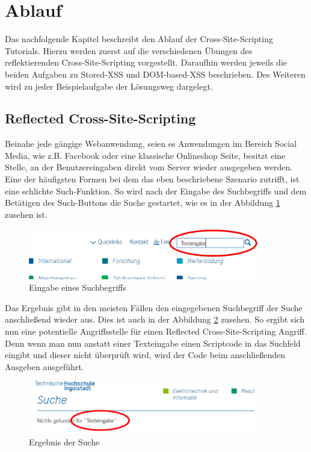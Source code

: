 \section{Ablauf}
Das nachfolgende Kapitel beschreibt den Ablauf der Cross-Site-Scripting Tutorials. Hierzu werden zuerst auf die verschiedenen Übungen des reflektierenden Cross-Site-Scripting vorgestellt. Daraufhin werden jeweils die beiden Aufgaben zu Stored-XSS und DOM-based-XSS beschrieben. Des Weiteren wird zu jeder Beispielaufgabe der Lösungsweg dargelegt. 

\subsection{Reflected Cross-Site-Scripting}
Beinahe jede gängige Webanwendung, seien es Anwendungen im Bereich Social Media, wie z.B. Facebook oder eine klassische Onlineshop Seite, besitzt eine Stelle, an der Benutzereingaben direkt vom Server wieder ausgegeben werden. \\
Eine der häufigsten Formen bei dem das eben beschriebene Szenario zutrifft, ist  eine schlichte Such-Funktion. So wird nach der Eingabe des Suchbegriffs und dem Betätigen des Such-Buttons die Suche gestartet, wie es in der Abbildung \ref{fig:xss-reflected-Suche1} zusehen ist. 

\begin{figure}[H]
	\centering
	\includegraphics[width=0.9\textwidth]{images/XSS/Testeingabe_markiert.jpg}
	\caption{Eingabe eines Suchbegriffs}
	\label{fig:xss-reflected-Suche1}
\end{figure}

Das Ergebnis gibt in den meisten Fällen den eingegebenen Suchbegriff der Suche anschließend wieder aus. Dies ist auch in der Abbildung \ref{fig:xss-reflected-Suche2}  zusehen. So ergibt sich nun eine potentielle Angriffsstelle für einen Reflected Cross-Site-Scripting Angriff. Denn wenn man nun anstatt einer Texteingabe einen Scriptcode in das Suchfeld eingibt und dieser nicht überprüft wird, wird der Code beim anschließenden Ausgeben ausgeführt.\\

\begin{figure}[H]
	\centering
	\includegraphics[width=0.9\textwidth]{images/XSS/Testergebnis_markiert.jpg}
	\caption{Ergebnis der Suche}
	\label{fig:xss-reflected-Suche2}
\end{figure}

